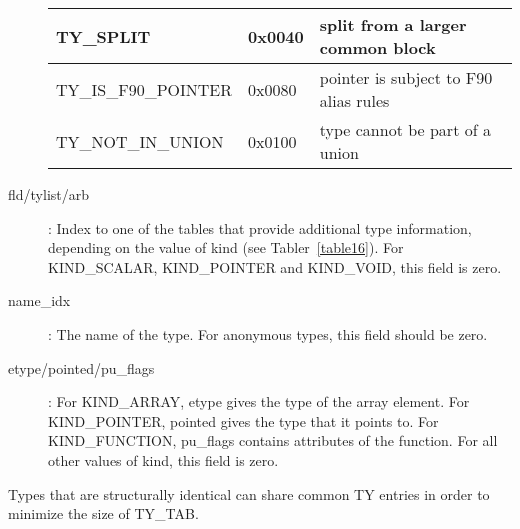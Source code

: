 \begin{description}
\begin{table}[h]
\begin{tabular}{|l|l|l|}
\index{TY\_SPLIT}%
TY\_SPLIT & 0x0040 & split from a larger common block\\\hline
\index{TY\_IS\_F90\_POINTER}%
TY\_IS\_F90\_POINTER & 0x0080 & pointer is subject to F90 alias rules \\\hline
\index{TY\_NOT\_IN\_UNION}%
TY\_NOT\_IN\_UNION & 0x0100 & type cannot be part of a union\\\hline
\end{tabular}
\end{table}

\item[fld/tylist/arb]: Index to one of the tables that provide
  additional type information, depending on the value of kind (see
Tabler~\ref{table16}). For KIND\_SCALAR,
%
KIND\_POINTER and KIND\_VOID, this
  field is zero.

\item[name\_idx]: The name of the type. For anonymous types, this
  field should be zero.

\item[etype/pointed/pu\_flags]: For KIND\_ARRAY, etype gives the type
  of the array element. For KIND\_POINTER, pointed gives the type that
  it points to. For KIND\_FUNCTION, pu\_flags contains attributes of
  the function. For all other values of kind, this field is zero.
\end{description}


Types that are structurally identical can share common
%
TY entries in
order to minimize the size of TY\_TAB.

